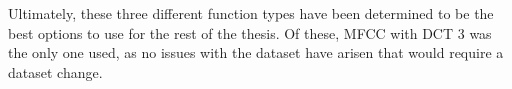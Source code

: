 Ultimately, these three different function types have been determined to be the best options to use for the rest of the thesis.
Of these, MFCC with DCT 3 was the only one used, as no issues with the dataset have arisen that would require a dataset change.








